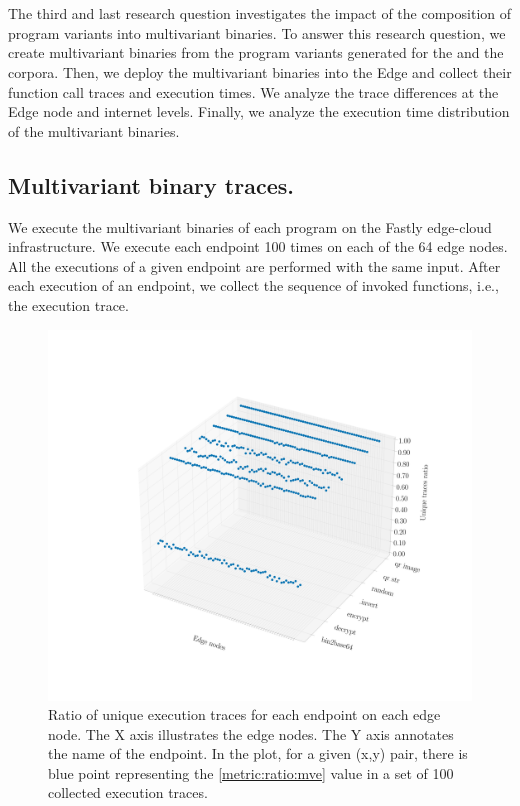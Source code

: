 \section{\rqthree}

The third and last research question investigates the impact of the composition of program variants into multivariant binaries.
To answer this research question, we create multivariant binaries from the program variants generated for the \corpussodium and the \corpusqrcode corpora. Then, we deploy the multivariant binaries into the Edge and collect their function call traces and execution times. We analyze the trace differences at the Edge node and internet levels. Finally, we analyze the execution time distribution of the multivariant binaries.

\subsection*{Multivariant binary traces.}

We execute the multivariant binaries of each program on the Fastly edge-cloud infrastructure. 
We execute each endpoint 100 times on each of the 64 edge nodes.
All the executions of a given endpoint are performed with the same input.
After each execution of an endpoint, we collect the sequence of invoked functions, i.e., the execution trace.

\begin{figure}[h]
    \includegraphics[width=0.9\linewidth]{plots/rq3.3d.pdf}
    \caption{Ratio of unique execution traces for each endpoint on each edge node.   The X axis illustrates the edge nodes.
    The Y axis annotates the name of the endpoint.
    In the plot, for a given (x,y) pair, there is blue point representing the \autoref{metric:ratio:mve} value in a set of 100 collected execution traces.}
    \label{rq3:hashes:collision}
\end{figure}


